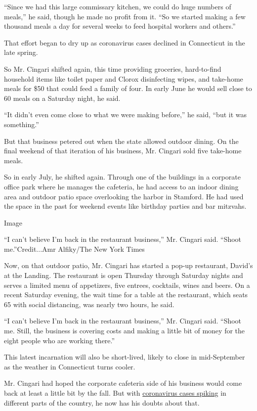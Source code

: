 ``Since we had this large commissary kitchen, we could do huge numbers
of meals,'' he said, though he made no profit from it. ``So we started
making a few thousand meals a day for several weeks to feed hospital
workers and others.''

That effort began to dry up as coronavirus cases declined in Connecticut
in the late spring.

So Mr. Cingari shifted again, this time providing groceries,
hard-to-find household items like toilet paper and Clorox disinfecting
wipes, and take-home meals for \$50 that could feed a family of four. In
early June he would sell close to 60 meals on a Saturday night, he said.

``It didn't even come close to what we were making before,'' he said,
``but it was something.''

But that business petered out when the state allowed outdoor dining. On
the final weekend of that iteration of his business, Mr. Cingari sold
five take-home meals.

So in early July, he shifted again. Through one of the buildings in a
corporate office park where he manages the cafeteria, he had access to
an indoor dining area and outdoor patio space overlooking the harbor in
Stamford. He had used the space in the past for weekend events like
birthday parties and bar mitzvahs.

Image

``I can't believe I'm back in the restaurant business,'' Mr. Cingari
said. ``Shoot me.''Credit...Amr Alfiky/The New York Times

Now, on that outdoor patio, Mr. Cingari has started a pop-up restaurant,
David's at the Landing. The restaurant is open Thursday through Saturday
nights and serves a limited menu of appetizers, five entrees, cocktails,
wines and beers. On a recent Saturday evening, the wait time for a table
at the restaurant, which seats 65 with social distancing, was nearly two
hours, he said.

``I can't believe I'm back in the restaurant business,'' Mr. Cingari
said. ``Shoot me. Still, the business is covering costs and making a
little bit of money for the eight people who are working there.''

This latest incarnation will also be short-lived, likely to close in
mid-September as the weather in Connecticut turns cooler.

Mr. Cingari had hoped the corporate cafeteria side of his business would
come back at least a little bit by the fall. But with
\href{https://www.nytimes.com/interactive/2020/us/coronavirus-us-cases.html}{coronavirus
cases spiking} in different parts of the country, he now has his doubts
about that.

